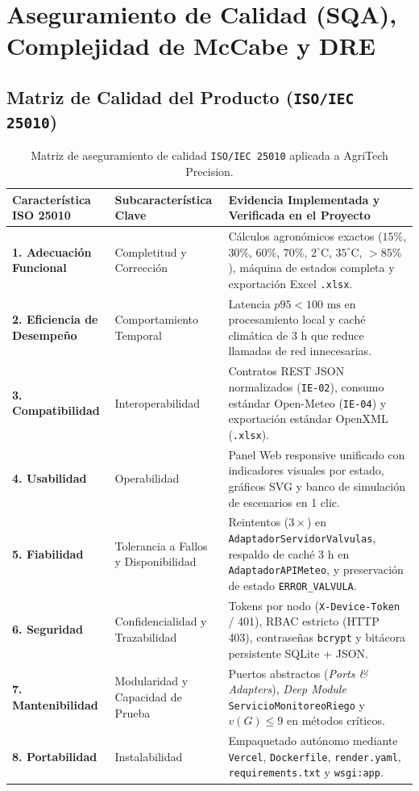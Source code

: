 \documentclass[11pt,letterpaper]{report}
\begin{document}
\chapter{Aseguramiento de Calidad (SQA), Complejidad de McCabe y DRE}

\section{Matriz de Calidad del Producto (\texttt{ISO/IEC 25010})}
\begin{table}[H]
\centering
\caption{Matriz de aseguramiento de calidad \texttt{ISO/IEC 25010} aplicada a AgriTech Precision.}
\small
\begin{tabularx}{\textwidth}{L{3.5cm} L{3.2cm} Y}
\toprule
\textbf{Característica ISO 25010} & \textbf{Subcaracterística Clave} & \textbf{Evidencia Implementada y Verificada en el Proyecto} \\
\midrule
\textbf{1. Adecuación Funcional} & Completitud y Corrección & Cálculos agronómicos exactos ($15\%$, $30\%$, $60\%$, $70\%$, $2^{\circ}\text{C}$, $35^{\circ}\text{C}$, $>85\%$), máquina de estados completa y exportación Excel \texttt{.xlsx}. \\
\textbf{2. Eficiencia de Desempeño} & Comportamiento Temporal & Latencia $p95 < 100\text{ ms}$ en procesamiento local y caché climática de $3\text{ h}$ que reduce llamadas de red innecesarias. \\
\textbf{3. Compatibilidad} & Interoperabilidad & Contratos REST JSON normalizados (\texttt{IE-02}), consumo estándar Open-Meteo (\texttt{IE-04}) y exportación estándar OpenXML (\texttt{.xlsx}). \\
\textbf{4. Usabilidad} & Operabilidad & Panel Web responsive unificado con indicadores visuales por estado, gráficos SVG y banco de simulación de escenarios en 1 clic. \\
\textbf{5. Fiabilidad} & Tolerancia a Fallos y Disponibilidad & Reintentos ($3\times$) en \texttt{AdaptadorServidorValvulas}, respaldo de caché 3 h en \texttt{AdaptadorAPIMeteo}, y preservación de estado \texttt{ERROR\_VALVULA}. \\
\textbf{6. Seguridad} & Confidencialidad y Trazabilidad & Tokens por nodo (\texttt{X-Device-Token} / 401), RBAC estricto (HTTP 403), contraseñas \texttt{bcrypt} y bitácora persistente SQLite + JSON. \\
\textbf{7. Mantenibilidad} & Modularidad y Capacidad de Prueba & Puertos abstractos (\textit{Ports \& Adapters}), \textit{Deep Module} \texttt{ServicioMonitoreoRiego} y $v(G) \le 9$ en métodos críticos. \\
\textbf{8. Portabilidad} & Instalabilidad & Empaquetado autónomo mediante \texttt{Vercel}, \texttt{Dockerfile}, \texttt{render.yaml}, \texttt{requirements.txt} y \texttt{wsgi:app}. \\
\bottomrule
\end{tabularx}
\end{table}
\end{document}
